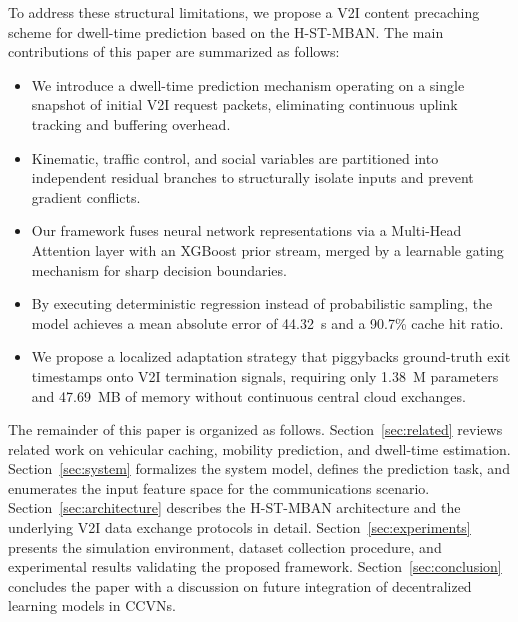 \documentclass[journal]{IEEEtran}
\begin{document}
To address these structural limitations, we propose a V2I content precaching scheme for dwell-time prediction based on the H-ST-MBAN. The main contributions of this paper are summarized as follows:
\begin{itemize}
\item We introduce a dwell-time prediction mechanism operating on a single snapshot of initial V2I request packets, eliminating continuous uplink tracking and buffering overhead.
\item Kinematic, traffic control, and social variables are partitioned into independent residual branches to structurally isolate inputs and prevent gradient conflicts.
\item Our framework fuses neural network representations via a Multi-Head Attention layer with an XGBoost prior stream, merged by a learnable gating mechanism for sharp decision boundaries.
\item By executing deterministic regression instead of probabilistic sampling, the model achieves a mean absolute error of 44.32~s and a 90.7\% cache hit ratio.
\item We propose a localized adaptation strategy that piggybacks ground-truth exit timestamps onto V2I termination signals, requiring only 1.38~M parameters and 47.69~MB of memory without continuous central cloud exchanges.
\end{itemize}



The remainder of this paper is organized as follows.
Section~\ref{sec:related} reviews related work on vehicular caching, mobility prediction, and dwell-time estimation.
Section~\ref{sec:system} formalizes the system model, defines the prediction task, and enumerates the input feature space for the communications scenario.
Section~\ref{sec:architecture} describes the H-ST-MBAN architecture and the underlying V2I data exchange protocols in detail.
Section~\ref{sec:experiments} presents the simulation environment, dataset collection procedure, and experimental results validating the proposed framework.
Section~\ref{sec:conclusion} concludes the paper with a discussion on future integration of decentralized learning models in CCVNs.
\end{document}
